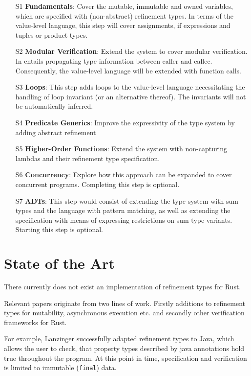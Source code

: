 \documentclass[11pt]{article}
\newcommand{\code}[1]{\texttt{#1}}
\begin{document}
\begin{itemize}
	\item[S1] \textbf{Fundamentals}: Cover the mutable, immutable and owned variables, which are specified with (non-abstract) refinement types. In terms of the value-level language, this step will cover assignments, if expressions and tuples or product types.
	\item[S2] \textbf{Modular Verification}: Extend the system to cover modular verification. In entails propagating type information between caller and callee. Consequently, the value-level language will be extended with function calls.
	\item[S3] \textbf{Loops}: This step adds loops to the value-level language necessitating the handling of loop invariant (or an  alternative thereof). The invariants will not be automatically inferred.
	\item[S4] \textbf{Predicate Generics}: Improve the expressivity of the type system by adding abstract refinement
	\item[S5] \textbf{Higher-Order Functions}: Extend the system with non-capturing lambdas and their refinement type specification.
	\item[S6] \textbf{Concurrency}: Explore how this approach can be expanded to cover concurrent programs. Completing this step is optional.
	\item[S7] \textbf{ADTs}: This step would consist of extending the type system with sum types and the language with pattern matching, as well as extending the specification with means of expressing restrictions on sum type variants. Starting this step is optional.
\end{itemize}

\section{State of the Art}

There currently does not exist an implementation of refinement types for Rust.

Relevant papers originate from two lines of work. Firstly additions to refinement types for mutability, asynchronous execution etc. and secondly other verification frameworks for Rust.

For example, Lanzinger \cite{lanzinger_property_2021} successfully adapted refinement types to Java, which allows the user to check, that property types described by java annotations hold true throughout the program. At this point in time, specification and verification is limited to immutable (\code{final}) data.
\end{document}
